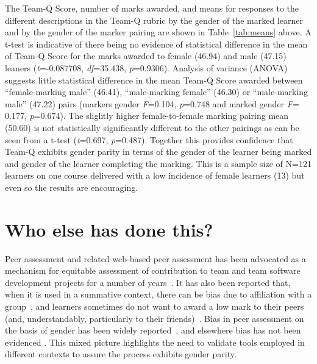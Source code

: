 \documentclass[sigconf, anonymous=true]{acmart}
\begin{document}
The Team-Q Score, number of marks awarded, and means for responses to
the different descriptions in the Team-Q rubric by the gender of the
marked learner and by the gender of the marker pairing are shown in
Table~\ref{tab:means} above. A t-test is indicative of there being no
evidence of statistical difference in the mean of Team-Q Score for the
marks awarded to female (46.94) and male (47.15) leaners
({\emph{t}}=-0.087708, {\emph{df}}=35.438,
{\emph{p}}=0.9306). Analysis of variance (ANOVA) suggests little
statistical difference in the mean Team-Q Score awarded between
``female-marking male'' (46.41), ``male-marking female'' (46.30) or
``male-marking male'' (47.22) pairs (markers gender {\emph{F}}=0.104,
{\emph{p}}=0.748 and marked gender {\emph{F}}= 0.177,
{\emph{p}}=0.674). The slightly higher female-to-female marking
pairing mean (50.60) is not statistically significantly different to
the other pairings as can be seen from a t-test ({\emph{t}}=0.697,
{\emph{p}}=0.487). Together this provides confidence that Team-Q
exhibits gender parity in terms of the gender of the learner being
marked and gender of the learner completing the marking. This is a
sample size of N=121 learners on one course delivered with a low
incidence of female learners (13) but even so the results are
encouraging.

\section{Who else has done this?}
Peer assessment and related web-based peer assessment has been
advocated as a mechanism for equitable assessment of contribution to
team and team software development projects for a number of
years~\cite{Clark2005,Raban_Litchfield_2007, Gordon2010,Fagerholm,
Britton2017,Philips21}. It has also been reported that, when it is
used in a summative context, there can be bias due to affiliation with
a group~\cite{Cestone2008}, and learners sometimes do not want to
award a low mark to their peers (and, understandably, particularly to
their friends)~\cite{Sridharam2003}. Bias in peer assessment on the
basis of gender has been widely
reported~\cite{Heels2019,Stonewall2018}, and elsewhere bias has not
been evidenced \cite{Tucker2014,Falchikov1997}. This mixed picture
highlights the need to validate tools employed in different contexts
to assure the process exhibits gender parity.
\end{document}
